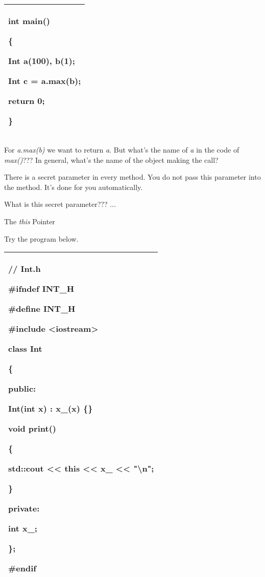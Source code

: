\documentclass[
]{article}
\begin{document}
\begin{longtable}[]{@{}l@{}}
\toprule
\endhead
\begin{minipage}[t]{0.97\columnwidth}\raggedright
int main()

\{

Int a(100), b(1);

Int c = a.max(b);

return 0;

\}\strut
\end{minipage}\tabularnewline
\bottomrule
\end{longtable}

For \emph{a.max(b)} we want to return \emph{a}. But what's the name of
\emph{a} in the code of \emph{max()}??? In general, what's the name of
the object making the call?

There is a secret parameter in every method. You do not pass this
parameter into the method. It's done for you automatically.

What is this secret parameter??? ...

The \emph{this} Pointer

Try the program below.

\begin{longtable}[]{@{}l@{}}
\toprule
\endhead
\begin{minipage}[t]{0.97\columnwidth}\raggedright
// Int.h

\#ifndef INT\_H

\#define INT\_H

\#include \textless iostream\textgreater{}

class Int

\{

public:

Int(int x) : x\_(x) \{\}

void print()

\{

\textbf{std::cout \textless\textless{} this \textless\textless{} x\_
\textless\textless{} "\textbackslash n";}

\}

private:

int x\_;

\};

\#endif\strut
\end{minipage}\tabularnewline
\bottomrule
\end{longtable}
\end{document}
